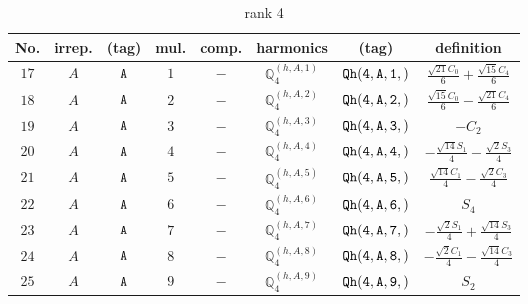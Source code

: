 \documentclass[fleqn,8pt]{jsarticle}
\begin{document}
\begin{table}[ht!]
\begin{center}
\caption{rank 4}
\renewcommand{\arraystretch}{1.3}
\begin{tabular}{cccccccc} \hline \hline
No. & irrep. & (tag) & mul. & comp. & harmonics & (tag) & definition \\ \hline
$ 17 $ & $ A $ & $ {\tt A} $ & $ 1 $ & $ - $ & $ \mathbb{Q}_{4}^{(h,A,1)} $ & $ {\tt Qh(4,A,1,)} $ & $ \frac{\sqrt{21} C_{0}}{6} + \frac{\sqrt{15} C_{4}}{6} $ \\
$ 18 $ & $ A $ & $ {\tt A} $ & $ 2 $ & $ - $ & $ \mathbb{Q}_{4}^{(h,A,2)} $ & $ {\tt Qh(4,A,2,)} $ & $ \frac{\sqrt{15} C_{0}}{6} - \frac{\sqrt{21} C_{4}}{6} $ \\
$ 19 $ & $ A $ & $ {\tt A} $ & $ 3 $ & $ - $ & $ \mathbb{Q}_{4}^{(h,A,3)} $ & $ {\tt Qh(4,A,3,)} $ & $ - C_{2} $ \\
$ 20 $ & $ A $ & $ {\tt A} $ & $ 4 $ & $ - $ & $ \mathbb{Q}_{4}^{(h,A,4)} $ & $ {\tt Qh(4,A,4,)} $ & $ - \frac{\sqrt{14} S_{1}}{4} - \frac{\sqrt{2} S_{3}}{4} $ \\
$ 21 $ & $ A $ & $ {\tt A} $ & $ 5 $ & $ - $ & $ \mathbb{Q}_{4}^{(h,A,5)} $ & $ {\tt Qh(4,A,5,)} $ & $ \frac{\sqrt{14} C_{1}}{4} - \frac{\sqrt{2} C_{3}}{4} $ \\
$ 22 $ & $ A $ & $ {\tt A} $ & $ 6 $ & $ - $ & $ \mathbb{Q}_{4}^{(h,A,6)} $ & $ {\tt Qh(4,A,6,)} $ & $ S_{4} $ \\
$ 23 $ & $ A $ & $ {\tt A} $ & $ 7 $ & $ - $ & $ \mathbb{Q}_{4}^{(h,A,7)} $ & $ {\tt Qh(4,A,7,)} $ & $ - \frac{\sqrt{2} S_{1}}{4} + \frac{\sqrt{14} S_{3}}{4} $ \\
$ 24 $ & $ A $ & $ {\tt A} $ & $ 8 $ & $ - $ & $ \mathbb{Q}_{4}^{(h,A,8)} $ & $ {\tt Qh(4,A,8,)} $ & $ - \frac{\sqrt{2} C_{1}}{4} - \frac{\sqrt{14} C_{3}}{4} $ \\
$ 25 $ & $ A $ & $ {\tt A} $ & $ 9 $ & $ - $ & $ \mathbb{Q}_{4}^{(h,A,9)} $ & $ {\tt Qh(4,A,9,)} $ & $ S_{2} $ \\
 \hline \hline
\end{tabular}
\end{center}
\end{table}
\end{document}
